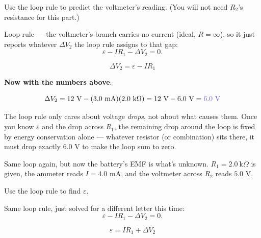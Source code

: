 \documentclass[12pt]{article}
\newcommand{\ANS}[1]{\textcolor{accent}{#1}}
\newcommand{\battv}[1]{%
  \draw[line width=0.7pt] ($(#1)+(0,0.55)$) -- ($(#1)+(0,0.12)$);
  \draw[line width=0.7pt] ($(#1)+(0,-0.12)$) -- ($(#1)+(0,-0.55)$);
  \draw[line width=1.1pt] ($(#1)+(-0.35,0.12)$) -- ($(#1)+(0.35,0.12)$);
  \draw[line width=2.4pt] ($(#1)+(-0.2,-0.12)$) -- ($(#1)+(0.2,-0.12)$);
  \node[scale=0.75] at ($(#1)+(0.6,0.12)$) {$+$};
  \node[scale=0.75] at ($(#1)+(0.6,-0.12)$) {$-$};
}
\newcommand{\reszig}[1]{%
  \fill[white] ($(#1)+(-0.65,-0.32)$) rectangle ($(#1)+(0.65,0.32)$);
  \draw ($(#1)+(-0.6,0)$)
    -- ($(#1)+(-0.42,0.22)$) -- ($(#1)+(-0.24,-0.22)$)
    -- ($(#1)+(-0.06,0.22)$) -- ($(#1)+(0.12,-0.22)$)
    -- ($(#1)+(0.3,0.22)$) -- ($(#1)+(0.48,-0.22)$)
    -- ($(#1)+(0.6,0)$);
}
\newcommand{\metercirc}[2]{%
  \fill[white] ($(#1)+(-0.3,-0.3)$) rectangle ($(#1)+(0.3,0.3)$);
  \draw ($(#1)$) circle (0.3);
  \node[scale=0.8] at (#1) {$#2$};
}
\begin{document}
Use the loop rule to predict the voltmeter's reading. (You will not need
$R_2$'s resistance for this part.)

{\small
Loop rule --- the voltmeter's branch carries no current (ideal, $R=\infty$),
so it just reports whatever $\Delta V_2$ the loop rule assigns to that gap:
\[
\varepsilon - IR_1 - \Delta V_2 = 0.
\]}

\[
\boxed{\Delta V_2 = \varepsilon - IR_1}
\]

\textbf{Now with the numbers above}:

\[
\Delta V_2 = 12\text{ V} - (3.0\text{ mA})(2.0\text{ k}\Omega)
= 12\text{ V} - 6.0\text{ V} = \ANS{6.0\text{ V}}
\]


{\small\color{accent} The loop rule only cares about voltage \emph{drops},
not about what causes them. Once you know $\varepsilon$ and the drop across
$R_1$, the remaining drop around the loop is fixed by energy conservation
alone --- whatever resistor (or combination) sits there, it must drop
exactly $6.0$ V to make the loop sum to zero.}


Same loop again, but now the battery's EMF is what's unknown.
$R_1=2.0\ \text{k}\Omega$ is given, the ammeter reads $I=4.0$ mA, and the
voltmeter across $R_2$ reads $5.0$ V.

\begin{center}
\end{center}

Use the loop rule to find $\varepsilon$.

{\small
Same loop rule, just solved for a different letter this time:
\[
\varepsilon - IR_1 - \Delta V_2 = 0.
\]}

\[
\boxed{\varepsilon = IR_1 + \Delta V_2}
\]
\end{document}
